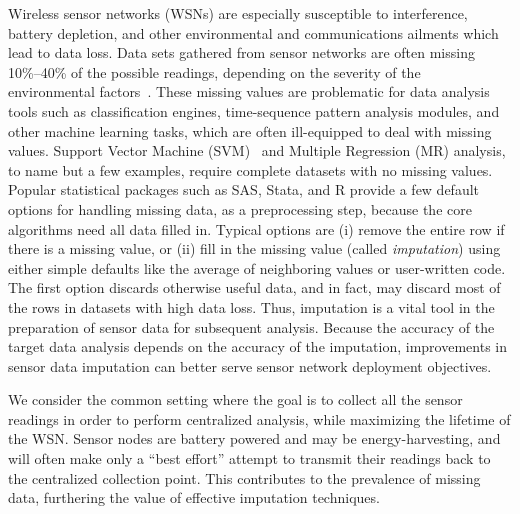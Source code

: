 

Wireless sensor networks (WSNs) are especially susceptible to interference,
battery depletion, and other environmental and communications ailments
which lead to data loss.  Data sets gathered from sensor networks are
often missing 10\%--40\% of the possible readings, depending on the
severity of the environmental factors~\cite{give cites}.  These
missing values are problematic for data analysis tools such as
classification engines, time-sequence pattern analysis modules, and
other machine learning tasks, which are often ill-equipped to deal
with missing values.  Support Vector Machine
(SVM)~\cite{vapnik2000nature} and Multiple Regression (MR) analysis,
to name but a few examples, require complete datasets with no missing
values.  Popular statistical packages such as SAS, Stata, and R
provide a few default options for handling missing data, as a
preprocessing step, because the core algorithms need all data filled
in.  Typical options are (i) remove the entire row if there is a
missing value, or (ii) fill in the missing value (called {\em
imputation}) using either simple defaults like the average of
neighboring values or user-written code.  The first option discards
otherwise useful data, and in fact, may discard most of the rows in
datasets with high data loss.  Thus, imputation is a vital tool in the
preparation of sensor data for subsequent analysis. Because the
accuracy of the target data analysis depends on the accuracy of the
imputation, improvements in sensor data imputation can better serve
sensor network deployment objectives.

We consider the common setting where the goal is to collect all the sensor readings
in order to perform centralized analysis, while maximizing the lifetime of the WSN.
Sensor nodes are battery powered and may be energy-harvesting, and will often make
only a ``best effort'' attempt to transmit their readings back to the centralized 
collection point.  This contributes to the prevalence of missing data, furthering
the value of effective imputation techniques.

